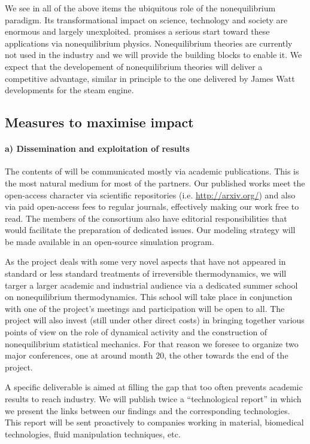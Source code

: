 We see in all of the above items the ubiquitous role of the nonequilibrium paradigm. Its
transformational impact on science, technology and society are enormous and largely
unexploited. \TheProject promises a serious start toward these applications via
nonequilibrium physics.
%
Nonequilibrium theories are currently not used in the industry and we will provide the
building blocks to enable it. We expect that the developement of nonequilibrium theories
will deliver a competitive advantage, similar in principle to the one delivered by James
Watt developments for the steam engine.

\subsection{Measures to maximise impact}

\paragraph{a) Dissemination and exploitation of results}

The contents of \TheProject will be communicated mostly via academic publications. This is
the most natural medium for most of the partners.
%
Our published works meet the open-access character via scientific repositories
(i.e. \url{http://arxiv.org/}) and also via paid open-access fees to regular journals,
effectively making our work free to read.
%
The members of the consortium also have editorial responsibilities that would facilitate the
preparation of dedicated issues.
%
Our modeling strategy will be made available in an open-source simulation program.

As the project deals with some very novel aspects that have not appeared in standard or less
standard treatments of irreversible thermodynamics, we will targer a larger academic and
industrial audience via a dedicated summer school on nonequilibrium thermodynamics. This
school will take place in conjunction with one of the project's meetings and participation
will be open to all.
%
The project will also invest (still under other direct costs) in bringing together various
points of view on the role of dynamical activity and the construction of nonequilibrium
statistical mechanics. For that reason we foresee to organize two major conferences, one at
around month 20, the other towards the end of the project.

A specific deliverable is aimed at filling the gap that too often prevents academic results
to reach industry. We will publish twice a ``technological report'' in which we present the
links between our findings and the corresponding technologies.
%
This report will be sent proactively to companies working in material, biomedical
technologies, fluid manipulation techniques, etc.


